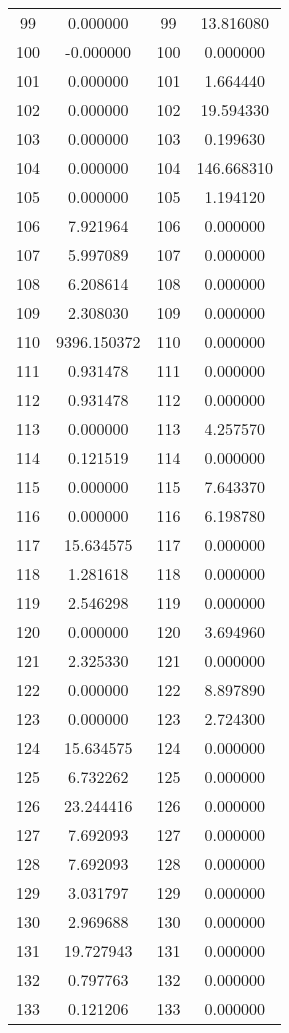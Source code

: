\documentclass[12pt]{article}
\begin{document}
\begin{longtable}{@{}cccc@{}}
99 & 0.000000 & 99 & 13.816080 \\
100 & -0.000000 & 100 & 0.000000 \\
101 & 0.000000 & 101 & 1.664440 \\
102 & 0.000000 & 102 & 19.594330 \\
103 & 0.000000 & 103 & 0.199630 \\
104 & 0.000000 & 104 & 146.668310 \\
105 & 0.000000 & 105 & 1.194120 \\
106 & 7.921964 & 106 & 0.000000 \\
107 & 5.997089 & 107 & 0.000000 \\
108 & 6.208614 & 108 & 0.000000 \\
109 & 2.308030 & 109 & 0.000000 \\
110 & 9396.150372 & 110 & 0.000000 \\
111 & 0.931478 & 111 & 0.000000 \\
112 & 0.931478 & 112 & 0.000000 \\
113 & 0.000000 & 113 & 4.257570 \\
114 & 0.121519 & 114 & 0.000000 \\
115 & 0.000000 & 115 & 7.643370 \\
116 & 0.000000 & 116 & 6.198780 \\
117 & 15.634575 & 117 & 0.000000 \\
118 & 1.281618 & 118 & 0.000000 \\
119 & 2.546298 & 119 & 0.000000 \\
120 & 0.000000 & 120 & 3.694960 \\
121 & 2.325330 & 121 & 0.000000 \\
122 & 0.000000 & 122 & 8.897890 \\
123 & 0.000000 & 123 & 2.724300 \\
124 & 15.634575 & 124 & 0.000000 \\
125 & 6.732262 & 125 & 0.000000 \\
126 & 23.244416 & 126 & 0.000000 \\
127 & 7.692093 & 127 & 0.000000 \\
128 & 7.692093 & 128 & 0.000000 \\
129 & 3.031797 & 129 & 0.000000 \\
130 & 2.969688 & 130 & 0.000000 \\
131 & 19.727943 & 131 & 0.000000 \\
132 & 0.797763 & 132 & 0.000000 \\
133 & 0.121206 & 133 & 0.000000 \\

\end{longtable}
\end{document}

